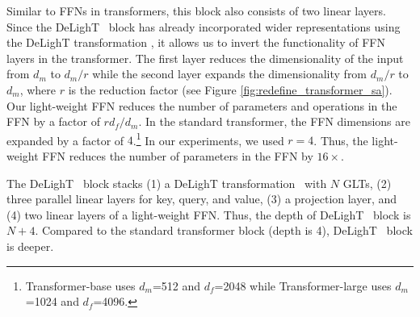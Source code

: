  Similar to FFNs in transformers, this block also consists of two linear layers. Since the DeLighT ~block has already incorporated wider representations using the DeLighT transformation , it allows us to invert the functionality of FFN layers in the transformer. The first layer reduces the dimensionality of the input from $d_m$ to $d_m/r$ while the second layer expands the dimensionality from $d_m/r$ to $d_m$, where $r$ is the reduction factor  (see Figure \ref{fig:redefine_transformer_sa}). Our light-weight FFN reduces the number of parameters and operations in the FFN by a factor of $r d_f/d_m$. In the standard transformer, the FFN dimensions are expanded by a factor of $4$.\footnote{Transformer-base uses $d_m$=512 and $d_f$=2048 while Transformer-large uses $d_m$=1024 and $d_f$=4096.} In our experiments, we used $r=4$. Thus, the light-weight FFN reduces the number of parameters in the FFN by $16\times$. 

 The DeLighT ~block stacks (1) a DeLighT transformation ~with $N$ GLTs, (2) three parallel linear layers for key, query, and value, (3) a projection layer, and  (4) two linear layers of a light-weight FFN. Thus, the depth of DeLighT ~block is $N + 4$. Compared to the standard transformer block (depth is 4), DeLighT ~block is deeper.

